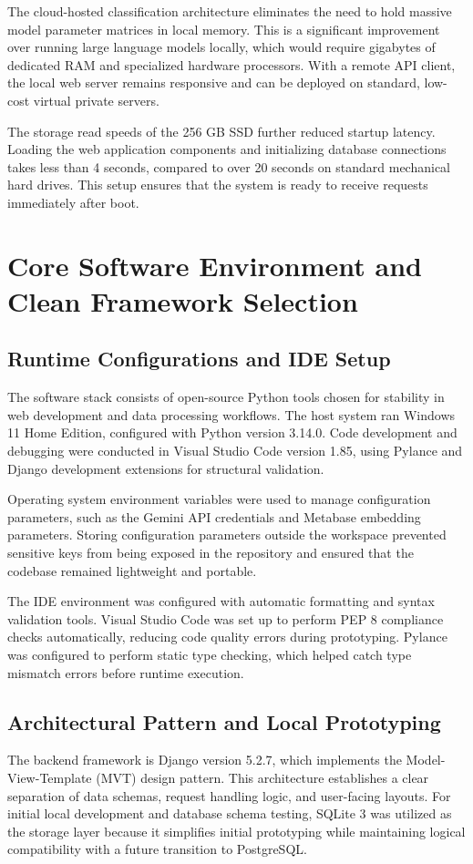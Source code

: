 The cloud-hosted classification architecture eliminates the need to hold massive model parameter matrices in local memory. This is a significant improvement over running large language models locally, which would require gigabytes of dedicated RAM and specialized hardware processors. With a remote API client, the local web server remains responsive and can be deployed on standard, low-cost virtual private servers.

The storage read speeds of the 256 GB SSD further reduced startup latency. Loading the web application components and initializing database connections takes less than 4 seconds, compared to over 20 seconds on standard mechanical hard drives. This setup ensures that the system is ready to receive requests immediately after boot.

\section{Core Software Environment and Clean Framework Selection}
\subsection{Runtime Configurations and IDE Setup}
The software stack consists of open-source Python tools chosen for stability in web development and data processing workflows. The host system ran Windows 11 Home Edition, configured with Python version 3.14.0. Code development and debugging were conducted in Visual Studio Code version 1.85, using Pylance and Django development extensions for structural validation.

Operating system environment variables were used to manage configuration parameters, such as the Gemini API credentials and Metabase embedding parameters. Storing configuration parameters outside the workspace prevented sensitive keys from being exposed in the repository and ensured that the codebase remained lightweight and portable.

The IDE environment was configured with automatic formatting and syntax validation tools. Visual Studio Code was set up to perform PEP 8 compliance checks automatically, reducing code quality errors during prototyping. Pylance was configured to perform static type checking, which helped catch type mismatch errors before runtime execution.

\subsection{Architectural Pattern and Local Prototyping}
The backend framework is Django version 5.2.7, which implements the Model-View-Template (MVT) design pattern. This architecture establishes a clear separation of data schemas, request handling logic, and user-facing layouts. For initial local development and database schema testing, SQLite 3 was utilized as the storage layer because it simplifies initial prototyping while maintaining logical compatibility with a future transition to PostgreSQL.

